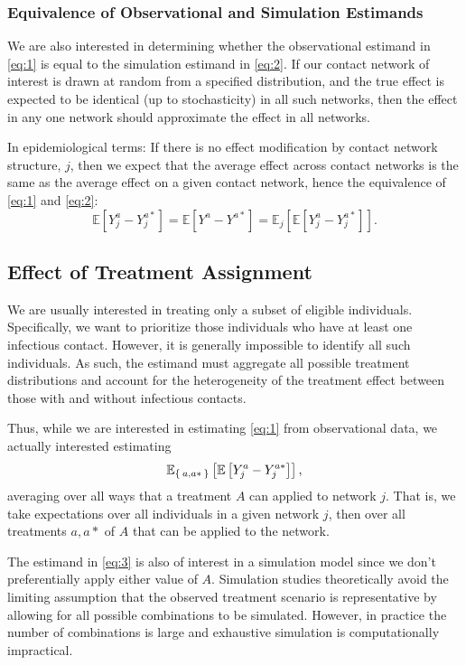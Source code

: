 \documentclass{article}
\theoremstyle{definition}
\begin{document}
\subsubsection{Equivalence of Observational and Simulation Estimands}
We are also interested in determining whether the observational estimand in \ref{eq:1} is equal to the simulation estimand in \ref{eq:2}. If our contact network of interest is drawn at random from a specified distribution, and the true effect is expected to be identical (up to stochasticity) in all such networks, then the effect in any one network should approximate the effect in all networks.

In epidemiological terms: If there is no effect modification by contact network structure, $j$, then we expect that the average effect across contact networks is the same as the average effect on a given contact network, hence the equivalence of \ref{eq:1} and \ref{eq:2}:
\begin{equation}\label{eq:7}
      \mathbb{E}\left[Y_{j}^{a}-Y_{j}^{a*}\right]=\mathbb{E}\left[Y^{a}-Y^{a*}\right]=\mathbb{E}_{j}\left[\mathbb{E}\left[Y_{j}^{a}-Y_{j}^{a*}\right]\right].
\end{equation}
\subsection{Effect of Treatment Assignment}
We are usually interested in treating only a subset of eligible individuals. Specifically, we want to prioritize those individuals who have at least one infectious contact. However, it is generally impossible to identify all such individuals. As such, the estimand must aggregate all possible treatment distributions and account for the heterogeneity of the treatment effect between those with and without infectious contacts.

Thus, while we are interested in estimating \ref{eq:1} from observational data, we actually interested estimating 
\begin{equation}\label{eq:3}
    \mathbb{E}_{\Set{a,a*   }}\left[\mathbb{E}\left[Y_{j}^{a}-Y_{j}^{a*}\right]\right],
\end{equation}
averaging over all ways that a treatment $A$ can applied to network $j$. That is, we take expectations over all individuals in a given network $j$, then over all treatments $a,a*$ of $A$ that can be applied to the network.

The estimand in \ref{eq:3} is also of interest in a simulation model since we don't preferentially apply either value of $A$. Simulation studies theoretically avoid the limiting assumption that the observed treatment scenario is representative by allowing for all possible combinations to be simulated. However, in practice the number of combinations is large and exhaustive simulation is computationally impractical.
\end{document}
